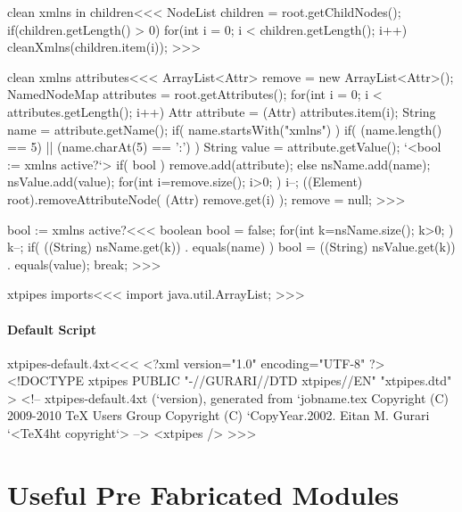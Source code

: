 \documentclass{article}
\begin{document}
\<clean xmlns in children\><<<
NodeList children = root.getChildNodes();
if(children.getLength() > 0) {
   for(int i = 0; i < children.getLength(); i++) {
      cleanXmlns(children.item(i));
}  }
>>>

\<clean xmlns attributes\><<<
ArrayList<Attr> remove = new ArrayList<Attr>();
NamedNodeMap attributes = root.getAttributes();
for(int i = 0; i < attributes.getLength(); i++) {
   Attr attribute = (Attr) attributes.item(i);
   String name = attribute.getName();
   if( name.startsWith("xmlns") ){
     if( (name.length() == 5) || (name.charAt(5) == ':') ){
        String value = attribute.getValue();
        `<bool := xmlns active?`>
        if( bool ){ remove.add(attribute);
        } else { nsName.add(name); nsValue.add(value); }
}  } }
for(int i=remove.size(); i>0; ){
   i--;
  ((Element) root).removeAttributeNode( (Attr) remove.get(i) );
}
remove = null;
>>>

\<bool := xmlns active?\><<<
boolean bool = false;
for(int k=nsName.size(); k>0; ){
  k--;
  if( ((String) nsName.get(k)) . equals(name) ){
     bool = ((String) nsValue.get(k)) . equals(value);
     break;
} }
>>>

\<xtpipes imports\><<<
import java.util.ArrayList;
>>>



\subsection{Default Script}


\<xtpipes-default.4xt\><<<
<?xml version="1.0" encoding="UTF-8" ?>
<!DOCTYPE xtpipes PUBLIC "-//GURARI//DTD xtpipes//EN" "xtpipes.dtd"  >
<!-- xtpipes-default.4xt (`version), generated from `jobname.tex
     Copyright (C) 2009-2010 TeX Users Group
     Copyright (C) `CopyYear.2002. Eitan M. Gurari
`<TeX4ht copyright`> -->
<xtpipes />
>>>












\part{Useful Pre Fabricated Modules}
\end{document}
